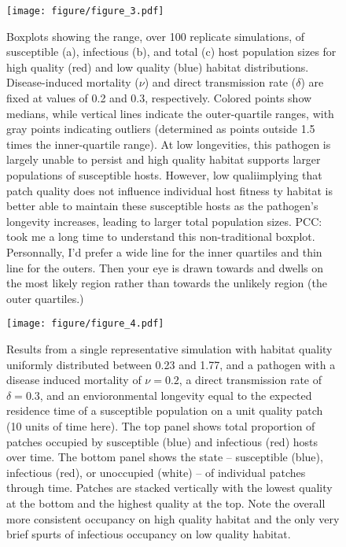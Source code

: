 \documentclass{article}
\begin{document}
\begin{figure}
\texttt{[image: figure/figure\_3.pdf]}
\centering
\caption{Boxplots showing the range, over 100 replicate simulations, of susceptible (a), infectious (b), and total (c) host population sizes for high quality (red) and low quality (blue) habitat distributions.  Disease-induced mortality ($\nu$) and direct transmission rate ($\delta$) are fixed at values of 0.2 and 0.3, respectively.  Colored points show medians, while vertical lines indicate the outer-quartile ranges, with gray points indicating outliers (determined as points outside 1.5 times the inner-quartile range).  At low longevities, this pathogen is largely unable to persist and high quality habitat supports larger populations of susceptible hosts.  However, low qualiimplying that patch quality does not influence individual host fitness ty habitat is better able to maintain these susceptible hosts as the pathogen's longevity increases, leading to larger total population sizes.  PCC: took me a long time to understand this non-traditional boxplot. Personnally, I'd prefer a wide line for the inner quartiles and thin line for the outers. Then your eye is drawn towards and dwells on the most likely region rather than towards the unlikely region (the outer quartiles.)}
\label{popsizes}
\end{figure}

\begin{figure}
\texttt{[image: figure/figure\_4.pdf]}
\centering
\caption{Results from a single representative simulation with habitat quality uniformly distributed between 0.23 and 1.77, and a pathogen with a disease induced mortality of $\nu = 0.2$, a direct transmission rate of $\delta = 0.3$, and an envioronmental longevity equal to the expected residence time of a susceptible population on a unit quality patch (10 units of time here).  The top panel shows total proportion of patches occupied by susceptible (blue) and infectious (red) hosts over time.  The bottom panel shows the state -- susceptible (blue), infectious (red), or unoccupied (white) -- of individual patches through time.  Patches are stacked vertically with the lowest quality at the bottom and the highest quality at the top.  Note the overall more consistent occupancy on high quality habitat and the only very brief spurts of infectious occupancy on low quality habitat.}
\label{simvis}
\end{figure}
\end{document}
